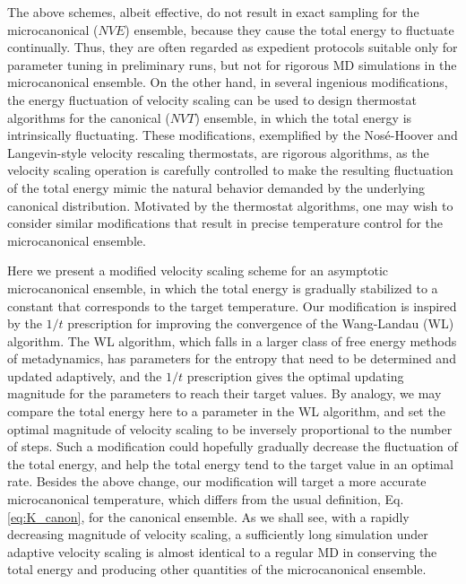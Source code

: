 \documentclass[reprint]{revtex4-1}
\begin{document}
The above schemes, albeit effective,
do not result in exact sampling for the microcanonical ($NVE$) ensemble\cite{hermansson1988},
because they cause the total energy to fluctuate continually.
%
Thus, they are often regarded as expedient protocols
suitable only for parameter tuning in preliminary runs,
but not for rigorous MD simulations in the microcanonical ensemble.
%
On the other hand, in several ingenious modifications,
the energy fluctuation of velocity scaling
can be used to design thermostat algorithms
for the canonical ($NVT$) ensemble, in which the total energy
is intrinsically fluctuating.
%
These modifications,
exemplified by the Nos\'e-Hoover\cite{nose1984, nose1984mp, hoover1985, martyna1992}
and Langevin-style velocity rescaling\cite{bussi2007} thermostats,
are rigorous algorithms, as
the velocity scaling operation is carefully
controlled to make
the resulting fluctuation of the total energy
mimic the natural behavior demanded by the underlying canonical distribution.
%
Motivated by the thermostat algorithms,
one may wish to consider similar modifications
that result in precise temperature control
for the microcanonical ensemble.

Here we present a modified velocity scaling scheme
for an asymptotic microcanonical ensemble,
in which
the total energy is gradually stabilized to a constant
that corresponds to the target temperature.
%
Our modification is inspired by the $1/t$ prescription\cite{
  belardinelli2007, belardinelli2007jcp, belardinelli2008,
  zhou2005, zhou2008, morozov2007}
for improving the convergence of
the Wang-Landau (WL) algorithm\cite{
  wang2001, wang2001pre}.
%
The WL algorithm,
which falls in a larger class of free energy methods
of metadynamics\cite{
  laio2002, laio2008, marsili2006},
has parameters for the entropy that need to be
determined and updated adaptively,
and the $1/t$ prescription gives the optimal updating magnitude
for the parameters to reach their target values.
%
By analogy, we may compare the total energy here
to a parameter in the WL algorithm,
and set the optimal magnitude
of velocity scaling to be inversely proportional
to the number of steps.
%
Such a modification could hopefully gradually decrease
the fluctuation of the total energy, and
help the total energy tend to the target value in an optimal rate.
%
Besides the above change,
our modification will target a more accurate
microcanonical temperature\cite{rugh1997},
which differs from the usual definition, Eq. \eqref{eq:K_canon},
for the canonical ensemble.
%
As we shall see,
with a rapidly decreasing magnitude of velocity scaling,
a sufficiently long simulation under adaptive velocity scaling
is almost identical to a regular MD
in conserving the total energy and producing other quantities
of the microcanonical ensemble.
\end{document}
